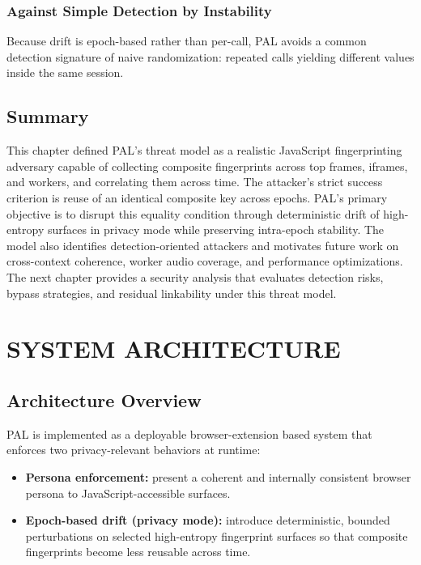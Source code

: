 \documentclass[11pt]{report}
\begin{document}
\subsection{Against Simple Detection by Instability}

Because drift is epoch-based rather than per-call, PAL avoids a common detection signature of naive randomization: repeated calls yielding different values inside the same session.

\section{Summary}

This chapter defined PAL’s threat model as a realistic JavaScript fingerprinting adversary capable of collecting composite fingerprints across top frames, iframes, and workers, and correlating them across time. The attacker’s strict success criterion is reuse of an identical composite key across epochs. PAL’s primary objective is to disrupt this equality condition through deterministic drift of high-entropy surfaces in privacy mode while preserving intra-epoch stability. The model also identifies detection-oriented attackers and motivates future work on cross-context coherence, worker audio coverage, and performance optimizations. The next chapter provides a security analysis that evaluates detection risks, bypass strategies, and residual linkability under this threat model.









\chapter{SYSTEM ARCHITECTURE}

\section{Architecture Overview}

PAL is implemented as a deployable browser-extension based system that enforces two privacy-relevant behaviors at runtime:

\begin{itemize}
    \item \textbf{Persona enforcement:} present a coherent and internally consistent browser persona to JavaScript-accessible surfaces.
    \item \textbf{Epoch-based drift (privacy mode):} introduce deterministic, bounded perturbations on selected high-entropy fingerprint surfaces so that composite fingerprints become less reusable across time.
\end{itemize}
\end{document}
